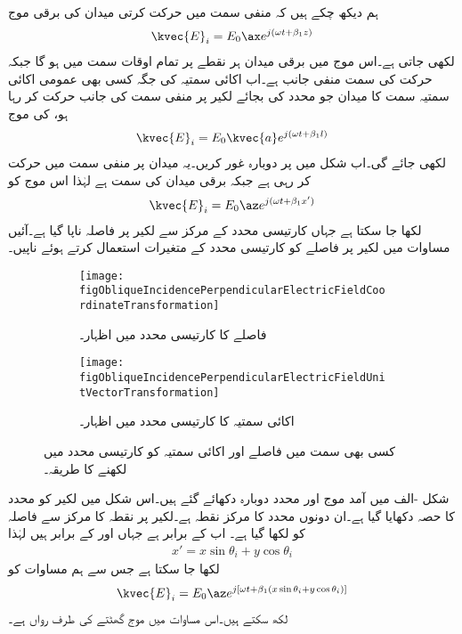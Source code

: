 ہم دیکھ چکے ہیں کہ منفی  سمت میں حرکت کرتی  میدان کی برقی موج
\begin{align*}
\kvec{E}_i=E_0 \ax e^{j(\omega t +\beta_1 z)}
\end{align*} 
لکھی جاتی ہے۔اس موج میں برقی میدان ہر نقطے پر تمام اوقات  سمت میں ہو گا جبکہ حرکت کی سمت منفی  جانب ہے۔اب  اکائی سمتیہ کی جگہ کسی بھی عمومی اکائی سمتیہ  سمت کا میدان جو  محدد کی بجائے لکیر  پر منفی سمت کی جانب حرکت کر رہا ہو، کی موج
\begin{align*}
\kvec{E}_i=E_0 \kvec{a} e^{j(\omega t +\beta_1 l)}
\end{align*} 
لکھی جائے گی۔اب شکل  میں  پر دوبارہ غور کریں۔یہ میدان  پر منفی سمت میں حرکت کر رہی ہے جبکہ برقی میدان  کی سمت  ہے  لہٰذا اس موج کو
\begin{align}\label{مساوات_ترچھا_آمد_ترچھی_کارتیسی}
\kvec{E}_i=E_0 \az e^{j(\omega t +\beta_1 x')}
\end{align}
لکھا جا سکتا ہے جہاں کارتیسی محدد  کے مرکز سے لکیر  پر فاصلہ ناپا گیا ہے۔آئیں مساوات  میں لکیر  پر فاصلے کو کارتیسی محدد  کے متغیرات استعمال کرتے ہوئے ناپیں۔
%
\begin{figure}
\centering
\begin{subfigure}{0.5\textwidth}
\centering
\texttt{[image: figObliqueIncidencePerpendicularElectricFieldCoordinateTransformation]}
\caption{فاصلے کا کارتیسی محدد میں اظہار۔}
\label{شکل_ترچھی_محدد_کی_تبدیلی}
\end{subfigure}%
\begin{subfigure}{0.5\textwidth}
\centering
\texttt{[image: figObliqueIncidencePerpendicularElectricFieldUnitVectorTransformation]}
\caption{اکائی سمتیہ کا کارتیسی محدد میں اظہار۔}
\label{شکل_ترچھی_اکائی_سمتیہ}
\end{subfigure}%
\caption{کسی بھی سمت میں فاصلے اور اکائی سمتیہ کو کارتیسی محدد میں لکھنے کا طریقہ۔}
\label{شکل_ترچھی_تبادلہ_فاصلہ_اور_اکائی_سمتیہ}
\end{figure}

شکل -الف میں آمد موج اور محدد  دوبارہ دکھائے گئے ہیں۔اس شکل میں لکیر  کو محدد  کا حصہ دکھایا گیا ہے۔ان دونوں محدد کا مرکز نقطہ  ہے۔لکیر  پر نقطہ  کا مرکز سے فاصلہ  کو  لکھا گیا ہے۔ اب  کے برابر ہے جہاں  اور  کے برابر ہیں لہٰذا
\begin{align}\label{مساوات_ترچھی_ترچھی_محدد_ایکس_کو_سیدھے_محدد_میں_لکھنا}
x'=x\sin \theta_i +y \cos \theta_i
\end{align} 
لکھا جا سکتا ہے جس سے ہم مساوات  کو
\begin{align}\label{مساوات_ترچھی_عمودی_برقی_آمدی}
\kvec{E}_i=E_0 \az e^{j[\omega t +\beta_1 (x\sin \theta_i +y \cos \theta_i)]}
\end{align}
لکھ سکتے ہیں۔اس مساوات میں موج  گھٹتے  کی طرف رواں ہے۔

